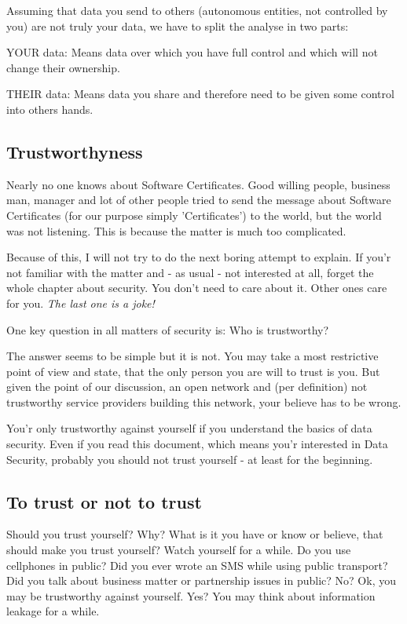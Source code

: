 \documentclass[twoside,a4paper,english,12pt,authoryear,openright]{book}
\begin{document}
Assuming that data you send to others (autonomous entities, not controlled by you)  are not truly your data, we have to split the analyse in two parts:

\begin{description}
  \item{YOUR data:} Means data over which you have full control and which will not change their ownership.
  \item{THEIR data:} Means data you share and therefore need to be given some control into others hands.
\end{description}

\subsection{Trustworthyness}

Nearly no one knows about Software Certificates. Good willing people, business man, manager and lot of other people tried to send the message about Software Certificates (for our purpose simply 'Certificates') to the world, but the world was not listening. This is because the matter is much too complicated.

Because of this, I will not try to do the next boring attempt to explain. If you'r not familiar with the matter and - as usual - not interested at all, forget the whole chapter about security. You don't need to care about it. Other ones care for you. \textit{The last one is a joke!}

One key question in all matters of security is: Who is trustworthy?

The answer seems to be simple but it is not. You may take a most restrictive point of view and state, that the only person you are will to trust is you. But given the point of our discussion, an open network and (per definition) not trustworthy service providers building this network, your believe has to be wrong.

You'r only trustworthy against yourself if you understand the basics of data security. Even if you read this document, which means you'r interested in Data Security, probably you should not trust yourself - at least for the beginning.

\subsection{To trust or not to trust}

Should you trust yourself? Why? What is it you have or know or believe, that should make you trust yourself? Watch yourself for a while. Do you use cellphones in public? Did you ever wrote an SMS while using public transport? Did you talk about business matter or partnership issues in public? No? Ok, you may be trustworthy against yourself. Yes? You may think about information leakage for a while.
\end{document}
